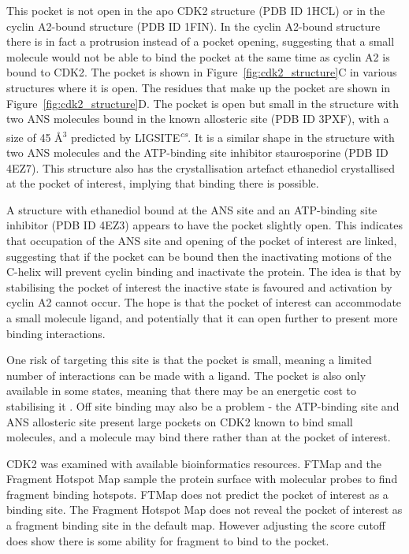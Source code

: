 This pocket is not open in the apo CDK2 structure (PDB ID 1HCL) or in the cyclin A2-bound structure (PDB ID 1FIN).
In the cyclin A2-bound structure there is in fact a protrusion instead of a pocket opening, suggesting that a small molecule would not be able to bind the pocket at the same time as cyclin A2 is bound to CDK2.
The pocket is shown in Figure~\ref{fig:cdk2_structure}C in various structures where it is open.
The residues that make up the pocket are shown in Figure~\ref{fig:cdk2_structure}D.
The pocket is open but small in the structure with two ANS molecules bound in the known allosteric site (PDB ID 3PXF), with a size of 45 \AA$^{3}$ predicted by LIGSITE\textsuperscript{\it cs}.
It is a similar shape in the structure with two ANS molecules and the ATP-binding site inhibitor staurosporine (PDB ID 4EZ7).
This structure also has the crystallisation artefact ethanediol crystallised at the pocket of interest, implying that binding there is possible.

A structure with ethanediol bound at the ANS site and an ATP-binding site inhibitor (PDB ID 4EZ3) appears to have the pocket slightly open.
This indicates that occupation of the ANS site and opening of the pocket of interest are linked, suggesting that if the pocket can be bound then the inactivating motions of the \textalpha C-helix will prevent cyclin binding and inactivate the protein.
The idea is that by stabilising the pocket of interest the inactive state is favoured and activation by cyclin A2 cannot occur.
The hope is that the pocket of interest can accommodate a small molecule ligand, and potentially that it can open further to present more binding interactions.

One risk of targeting this site is that the pocket is small, meaning a limited number of interactions can be made with a ligand.
The pocket is also only available in some states, meaning that there may be an energetic cost to stabilising it \cite{Oleinikovas2016}.
Off site binding may also be a problem - the ATP-binding site and ANS allosteric site present large pockets on CDK2 known to bind small molecules, and a molecule may bind there rather than at the pocket of interest.

CDK2 was examined with available bioinformatics resources.
FTMap \cite{Kozakov2015} and the Fragment Hotspot Map \cite{Radoux2016} sample the protein surface with molecular probes to find fragment binding hotspots.
FTMap \cite{Kozakov2015} does not predict the pocket of interest as a binding site.
The Fragment Hotspot Map \cite{Radoux2016} does not reveal the pocket of interest as a fragment binding site in the default map.
However adjusting the score cutoff does show there is some ability for fragment to bind to the pocket.

